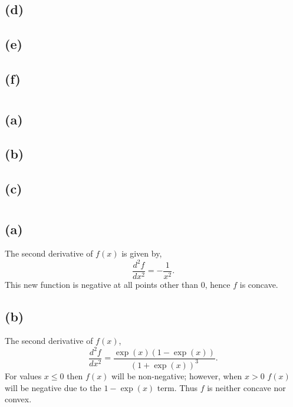 \documentclass[10pt]{article}
\begin{document}
\subsection*{(d)}
\subsection*{(e)}
\subsection*{(f)}

\section{}
\subsection*{(a)}
\subsection*{(b)}
\subsection*{(c)}

\section{}
\subsection*{(a)}
The second derivative of $f(x)$ is given by, \[\frac{d^2 f}{d x^2} = -\frac{1}{x^2}.\] This new function
is negative at all points other than 0, hence $f$ is concave.
\subsection*{(b)}
The second derivative of $f(x)$, \[\frac{d^2 f}{d x^2} = \frac{\exp(x)(1 - \exp(x))}{(1 +
\exp(x))^3}.\] For values $x \leq 0$ then $f(x)$ will be non-negative; however, when $x > 0$
$f(x)$ will be negative due to the $1 - \exp(x)$ term. Thus $f$ is neither concave nor convex.

\section{}
\end{document}
